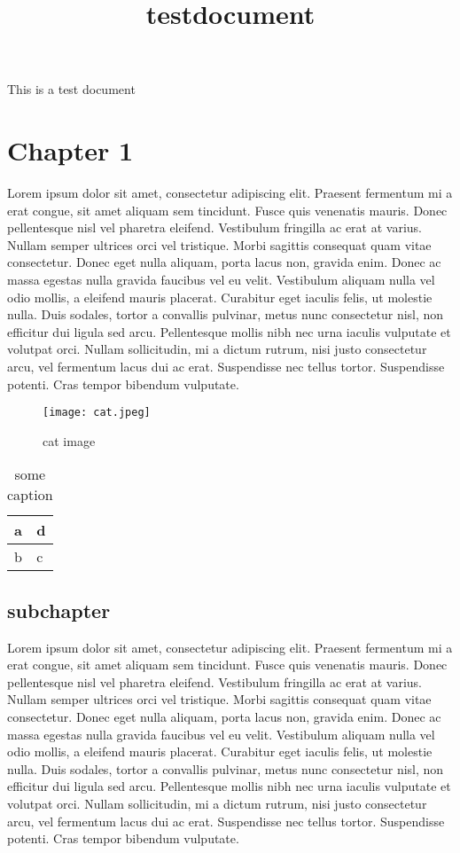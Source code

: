 \documentclass[a4paper, 12pt]{scrbook}
\title{testdocument}
\begin{document}
\maketitle


This is a test document


\chapter{Chapter 1}

Lorem ipsum dolor sit amet, consectetur adipiscing elit. Praesent fermentum mi a erat congue, sit amet aliquam sem tincidunt. Fusce quis venenatis mauris. Donec pellentesque nisl vel pharetra eleifend. Vestibulum fringilla ac erat at varius. Nullam semper ultrices orci vel tristique. Morbi sagittis consequat quam vitae consectetur. Donec eget nulla aliquam, porta lacus non, gravida enim. Donec ac massa egestas nulla gravida faucibus vel eu velit. Vestibulum aliquam nulla vel odio mollis, a eleifend mauris placerat. Curabitur eget iaculis felis, ut molestie nulla. Duis sodales, tortor a convallis pulvinar, metus nunc consectetur nisl, non efficitur dui ligula sed arcu. Pellentesque mollis nibh nec urna iaculis vulputate et volutpat orci. Nullam sollicitudin, mi a dictum rutrum, nisi justo consectetur arcu, vel fermentum lacus dui ac erat. Suspendisse nec tellus tortor. Suspendisse potenti. Cras tempor bibendum vulputate.

\begin{figure}
\texttt{[image: cat.jpeg]}
\caption{cat image}
\label{figure_chxgba_b1}
\end{figure}

\begin{table}
\begin{tabular}{ll}
a&d \\ \hline
b&c \\ \hline
\end{tabular}
\caption{some caption}
\label{table_chxgba_c1}
\end{table}

\section{subchapter}

Lorem ipsum dolor sit amet, consectetur adipiscing elit. Praesent fermentum mi a erat congue, sit amet aliquam sem tincidunt. Fusce quis venenatis mauris. Donec pellentesque nisl vel pharetra eleifend. Vestibulum fringilla ac erat at varius. Nullam semper ultrices orci vel tristique. Morbi sagittis consequat quam vitae consectetur. Donec eget nulla aliquam, porta lacus non, gravida enim. Donec ac massa egestas nulla gravida faucibus vel eu velit. Vestibulum aliquam nulla vel odio mollis, a eleifend mauris placerat. Curabitur eget iaculis felis, ut molestie nulla. Duis sodales, tortor a convallis pulvinar, metus nunc consectetur nisl, non efficitur dui ligula sed arcu. Pellentesque mollis nibh nec urna iaculis vulputate et volutpat orci. Nullam sollicitudin, mi a dictum rutrum, nisi justo consectetur arcu, vel fermentum lacus dui ac erat. Suspendisse nec tellus tortor. Suspendisse potenti. Cras tempor bibendum vulputate.
\end{document}
